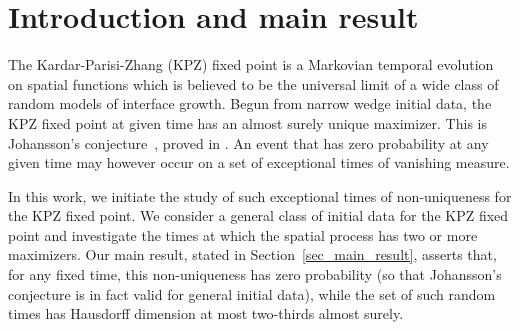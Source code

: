 \documentclass[oneside,final,11pt]{amsart}
\theoremstyle{definition}
\newcommand{\Airy}{Airy$_2$~}
\newcommand{\1}[1]{\mathbf{1}_{#1}}
\newcommand{\kmtext}[1]{{\color{red}[KM:#1]}}
\numberwithin{equation}{section}
\begin{document}
\begin{abstract}
%
\end{abstract}



\maketitle

\tableofcontents



\section{Introduction and main result}

The Kardar-Parisi-Zhang (KPZ) fixed point is a Markovian temporal evolution on spatial functions which is believed to be the universal limit of a wide class of random models of interface growth. Begun from narrow wedge initial data, the KPZ fixed point at given time has an almost surely unique maximizer. This is Johansson's conjecture~\cite{JohanssonPoly}, proved in \cite{BrownianGibbs,MaxOfAiry2,pimentel_2014}. An event that has zero probability at any given time may however occur on a set of exceptional times of vanishing measure.

In this work, we initiate the study of such exceptional times of non-uniqueness for the KPZ fixed point. We consider a general class of initial data for the KPZ fixed point and investigate the times at which the spatial process has two or more maximizers. Our main result, stated in Section~\ref{sec_main_result}, asserts that, for any fixed time, this non-uniqueness has zero probability (so that Johansson's conjecture is in fact valid for general initial data), while the set of such random times has Hausdorff dimension at most two-thirds almost surely.
\end{document}
